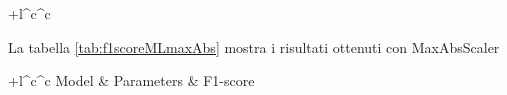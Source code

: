 \begin{center}
\begin{tabular}{+l^c^c}
                	\toprule\rowstyle{\bfseries}
                \end{tabular}
            	\label{tab:fscoreMLMinMax}
		        \end{center}
	        
	        
	        
		        \begin{center}
		        	La tabella \ref{tab:f1scoreMLmaxAbs} mostra i risultati ottenuti con MaxAbsScaler\\
		        	\begin{tabular}{+l^c^c}
		        		\toprule\rowstyle{\bfseries}
		        		Model & Parameters & F1-score \\
		        		\toprule
		        		

\end{tabular}
\end{center}
